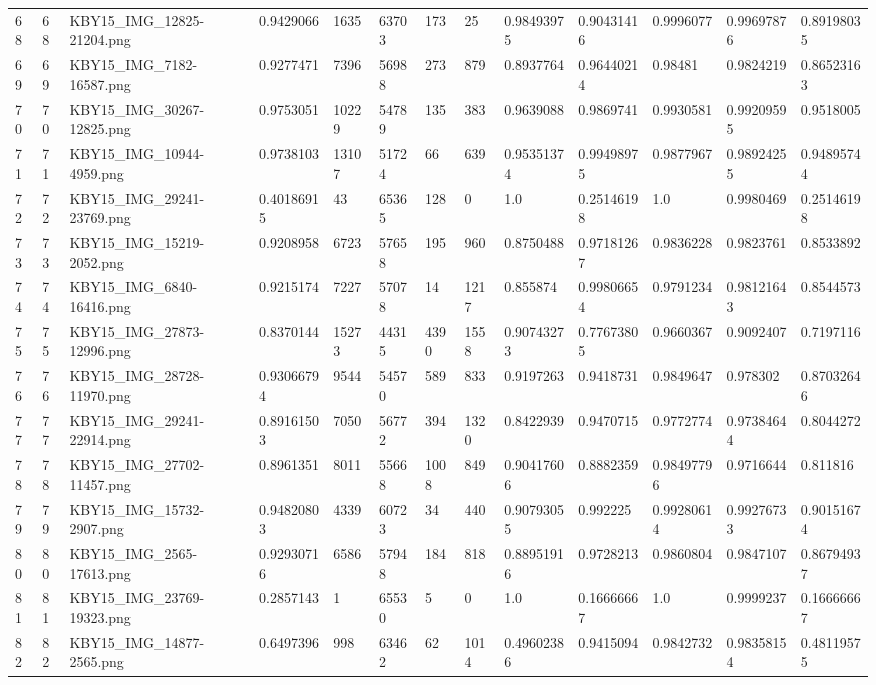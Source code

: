 \documentclass[11pt, a4paper, twoside]{report}
\begin{document}
\begin{longtable}[c]{@{}lllllllllllll@{}}
68 & 68 & KBY15\_IMG\_12825-21204.png & 0.9429066 & 1635 & 63703 & 173 & 25 & 0.98493975 & 0.90431416 & 0.9996077 & 0.99697876 & 0.89198035 \\
69 & 69 & KBY15\_IMG\_7182-16587.png & 0.9277471 & 7396 & 56988 & 273 & 879 & 0.8937764 & 0.96440214 & 0.98481 & 0.9824219 & 0.86523163 \\
70 & 70 & KBY15\_IMG\_30267-12825.png & 0.9753051 & 10229 & 54789 & 135 & 383 & 0.9639088 & 0.9869741 & 0.9930581 & 0.99209595 & 0.9518005 \\
71 & 71 & KBY15\_IMG\_10944-4959.png & 0.9738103 & 13107 & 51724 & 66 & 639 & 0.95351374 & 0.99498975 & 0.9877967 & 0.98924255 & 0.94895744 \\
72 & 72 & KBY15\_IMG\_29241-23769.png & 0.40186915 & 43 & 65365 & 128 & 0 & 1.0 & 0.25146198 & 1.0 & 0.9980469 & 0.25146198 \\
73 & 73 & KBY15\_IMG\_15219-2052.png & 0.9208958 & 6723 & 57658 & 195 & 960 & 0.8750488 & 0.97181267 & 0.9836228 & 0.9823761 & 0.8533892 \\
74 & 74 & KBY15\_IMG\_6840-16416.png & 0.9215174 & 7227 & 57078 & 14 & 1217 & 0.855874 & 0.99806654 & 0.9791234 & 0.98121643 & 0.8544573 \\
75 & 75 & KBY15\_IMG\_27873-12996.png & 0.8370144 & 15273 & 44315 & 4390 & 1558 & 0.90743273 & 0.77673805 & 0.9660367 & 0.9092407 & 0.7197116 \\
76 & 76 & KBY15\_IMG\_28728-11970.png & 0.93066794 & 9544 & 54570 & 589 & 833 & 0.9197263 & 0.9418731 & 0.9849647 & 0.978302 & 0.87032646 \\
77 & 77 & KBY15\_IMG\_29241-22914.png & 0.89161503 & 7050 & 56772 & 394 & 1320 & 0.8422939 & 0.9470715 & 0.9772774 & 0.97384644 & 0.8044272 \\
78 & 78 & KBY15\_IMG\_27702-11457.png & 0.8961351 & 8011 & 55668 & 1008 & 849 & 0.90417606 & 0.8882359 & 0.98497796 & 0.9716644 & 0.811816 \\
79 & 79 & KBY15\_IMG\_15732-2907.png & 0.94820803 & 4339 & 60723 & 34 & 440 & 0.90793055 & 0.992225 & 0.99280614 & 0.99276733 & 0.90151674 \\
80 & 80 & KBY15\_IMG\_2565-17613.png & 0.92930716 & 6586 & 57948 & 184 & 818 & 0.88951916 & 0.9728213 & 0.9860804 & 0.9847107 & 0.86794937 \\
81 & 81 & KBY15\_IMG\_23769-19323.png & 0.2857143 & 1 & 65530 & 5 & 0 & 1.0 & 0.16666667 & 1.0 & 0.9999237 & 0.16666667 \\
82 & 82 & KBY15\_IMG\_14877-2565.png & 0.6497396 & 998 & 63462 & 62 & 1014 & 0.49602386 & 0.9415094 & 0.9842732 & 0.98358154 & 0.48119575 \\

\end{longtable}
\end{document}
